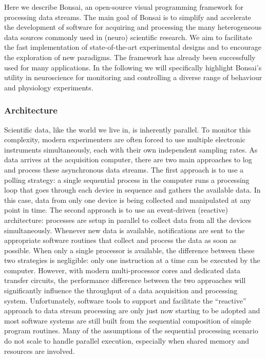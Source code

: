 Here we describe Bonsai, an open-source visual programming framework for processing data streams. The main goal of Bonsai is to simplify and accelerate the development of software for acquiring and processing the many heterogeneous data sources commonly used in (neuro) scientific research. We aim to facilitate the fast implementation of state-of-the-art experimental designs and to encourage the exploration of new paradigms. The framework has already been successfully used for many applications. In the following we will specifically highlight Bonsai's utility in neuroscience for monitoring and controlling a diverse range of behaviour and physiology experiments.

\subsubsection{Architecture}

Scientific data, like the world we live in, is inherently parallel. To monitor this complexity, modern experimenters are often forced to use multiple electronic instruments simultaneously, each with their own independent sampling rates. As data arrives at the acquisition computer, there are two main approaches to log and process these asynchronous data streams. The first approach is to use a polling strategy: a single sequential process in the computer runs a processing loop that goes through each device in sequence and gathers the available data. In this case, data from only one device is being collected and manipulated at any point in time. The second approach is to use an event-driven (reactive) architecture: processes are setup in parallel to collect data from all the devices simultaneously. Whenever new data is available, notifications are sent to the appropriate software routines that collect and process the data as soon as possible. When only a single processor is available, the difference between these two strategies is negligible: only one instruction at a time can be executed by the computer. However, with modern multi-processor cores and dedicated data transfer circuits, the performance difference between the two approaches will significantly influence the throughput of a data acquisition and processing system. Unfortunately, software tools to support and facilitate the “reactive” approach to data stream processing are only just now starting to be adopted and most software systems are still built from the sequential composition of simple program routines. Many of the assumptions of the sequential processing scenario do not scale to handle parallel execution, especially when shared memory and resources are involved.

